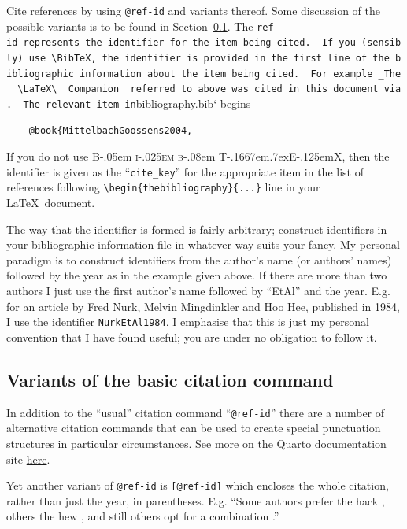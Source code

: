 \documentclass[
doublespace,
  times]{anzsauth}
\newcommand\BibTeX{{\rmfamily B\kern-.05em \textsc{i\kern-.025em b}\kern-.08em
T\kern-.1667em\lower.7ex\hbox{E}\kern-.125emX}}
\begin{document}
Cite references by using \texttt{@ref-id} and variants thereof. Some
discussion of the possible variants is to be found in
Section~\ref{sec-citeVar}. The
\texttt{ref-id\textasciigrave{}\textasciigrave{}\ represents\ the\ identifier\ for\ the\ item\ being\ cited.\ \ If\ you\ (sensibly)\ use\ \textbackslash{}BibTeX,\ the\ identifier\ is\ provided\ in\ the\ first\ line\ of\ the\ bibliographic\ information\ about\ the\ item\ being\ cited.\ \ For\ example\ \_The\_\ \textbackslash{}LaTeX\textbackslash{}\ \_Companion\_\ referred\ to\ above\ was\ cited\ in\ this\ document\ via}\citet{MittelbachGoossens2004}\texttt{.\ \ The\ relevant\ item\ in}bibliography.bib`
begins

\begin{verbatim}
    @book{MittelbachGoossens2004,
\end{verbatim}

If you do not use \BibTeX, then the identifier is given as the
``\texttt{cite\_key}'' for the appropriate item in the list of
references following
\texttt{\textbackslash{}begin\{thebibliography\}\{...\}} line in your
\LaTeX~document.

The way that the identifier is formed is fairly arbitrary; construct
identifiers in your bibliographic information file in whatever way suits
your fancy. My personal paradigm is to construct identifiers from the
author's name (or authors' names) followed by the year as in the example
given above. If there are more than two authors I just use the first
author's name followed by ``EtAl'' and the year. E.g. for an article by
Fred Nurk, Melvin Mingdinkler and Hoo Hee, published in 1984, I use the
identifier \texttt{NurkEtAl1984}. I emphasise that this is just my
personal convention that I have found useful; you are under no
obligation to follow it.

\subsection{Variants of the basic citation command}\label{sec-citeVar}

In addition to the ``usual'' citation command ``\texttt{@ref-id}'' there
are a number of alternative citation commands that can be used to create
special punctuation structures in particular circumstances. See more on
the Quarto documentation site
\href{https://quarto.org/docs/authoring/citations.html\#sec-citations}{here}.

Yet another variant of \texttt{@ref-id} is \texttt{{[}@ref-id{]}} which
encloses the whole citation, rather than just the year, in parentheses.
E.g. ``Some authors prefer the hack \citep{Cook1966}, others the hew
\citep{Moore1967}, and still others opt for a combination
\citep{CookMoore1968}.''
\end{document}
